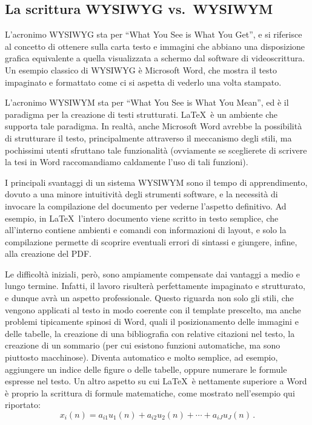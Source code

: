 \documentclass[12pt]{report}
\begin{document}
\subsection{La scrittura WYSIWYG vs.\ WYSIWYM}

L'acronimo WYSIWYG sta per ``What You See is What You Get'', e si riferisce al concetto di ottenere sulla carta testo e immagini che abbiano una disposizione grafica equivalente a quella visualizzata a schermo dal software di videoscrittura. Un esempio classico di WYSIWYG è Microsoft Word, che mostra il testo impaginato e formattato come ci si aspetta di vederlo una volta stampato.

L'acronimo WYSIWYM sta per ``What You See is What You Mean'', ed è il paradigma per la creazione di testi strutturati. \LaTeX\ è un ambiente che supporta tale paradigma. In realtà, anche Microsoft Word avrebbe la possibilità di strutturare il testo, principalmente attraverso il meccanismo degli stili, ma pochissimi utenti sfruttano tale funzionalità (ovviamente se sceglierete di scrivere la tesi in Word raccomandiamo caldamente l'uso di tali funzioni).

I principali svantaggi di un sistema WYSIWYM sono il tempo di apprendimento, dovuto a una minore intuitività degli strumenti software, e la necessità di invocare la compilazione del documento per vederne l'aspetto definitivo. Ad esempio, in \LaTeX\ l'intero documento viene scritto in testo semplice, che all'interno contiene ambienti e comandi con informazioni di layout, e solo la compilazione permette di scoprire eventuali errori di sintassi e giungere, infine, alla creazione del PDF.

Le difficoltà iniziali, però, sono ampiamente compensate dai vantaggi a medio e lungo termine. Infatti, il lavoro risulterà perfettamente impaginato e strutturato, e dunque avrà un aspetto professionale. Questo riguarda non solo gli stili, che vengono applicati al testo in modo coerente con il template prescelto, ma anche problemi tipicamente spinosi di Word, quali il posizionamento delle immagini e delle tabelle, la creazione di una bibliografia con relative citazioni nel testo, la creazione di un sommario (per cui esistono funzioni automatiche, ma sono piuttosto macchinose). Diventa automatico e molto semplice, ad esempio, aggiungere un indice delle figure o delle tabelle, oppure numerare le formule espresse nel testo. Un altro aspetto su cui \LaTeX\ è nettamente superiore a Word è proprio la scrittura di formule matematiche, come mostrato nell'esempio qui riportato:
\begin{equation}
x_i(n) = a_{i1}u_1(n) + a_{i2}u_2(n) + \cdots + a_{iJ}u_J(n) \, .
\label{eq:multimix}
\end{equation}
\end{document}
